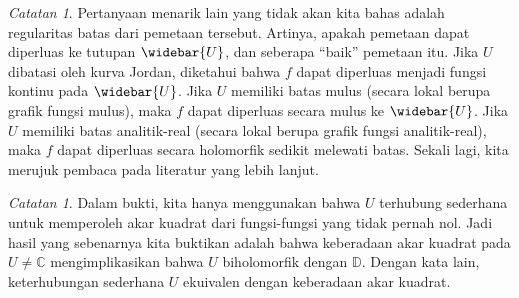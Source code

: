 \documentclass[12pt,openany]{book}
\newcommand{\C}{{\mathbb{C}}}
\newcommand{\D}{{\mathbb{D}}}
\newcommand{\myquote}[1]{``#1''}
\theoremstyle{plain}
\theoremstyle{remark}
\newtheorem{remark}[thm]{Catatan}
\theoremstyle{definition}
\theoremstyle{exercise}
\theoremstyle{example}
\begin{document}
\begin{remark}
Pertanyaan menarik lain yang tidak akan kita bahas
adalah regularitas batas dari pemetaan tersebut.  Artinya, apakah pemetaan dapat diperluas ke
tutupan $\widebar{U}$, dan seberapa \myquote{baik} pemetaan itu.  Jika $U$
dibatasi oleh kurva Jordan, diketahui bahwa $f$ dapat diperluas menjadi fungsi kontinu pada
$\widebar{U}$.  Jika $U$ memiliki batas mulus (secara lokal berupa grafik fungsi
mulus), maka $f$ dapat diperluas secara mulus ke $\widebar{U}$.
Jika $U$ memiliki batas analitik-real (secara lokal berupa grafik fungsi
analitik-real), maka $f$ dapat diperluas secara holomorfik sedikit melewati batas.
Sekali lagi, kita merujuk pembaca pada literatur yang lebih lanjut.
\end{remark}

\begin{remark}
Dalam bukti, kita hanya menggunakan bahwa $U$ terhubung sederhana untuk 
memperoleh akar kuadrat dari fungsi-fungsi yang tidak pernah nol.  Jadi hasil yang sebenarnya
kita buktikan adalah bahwa keberadaan akar kuadrat pada $U \neq \C$ mengimplikasikan bahwa $U$
biholomorfik dengan $\D$.  Dengan kata lain, keterhubungan sederhana
$U$ ekuivalen dengan keberadaan akar kuadrat.
\end{remark}
\end{document}
